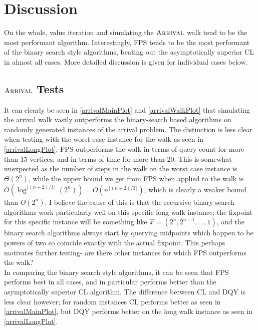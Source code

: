 \section{Discussion}
On the whole, value iteration and simulating the $\textsc{Arrival}$ walk tend to be
the most performant algorithm. Interestingly, FPS tends to be the most
performant of the binary search style algorithms, beating out the asymptotically
superior CL in almost all cases. More detailed discussion is given for individual cases below.
\subsection{$\textsc{Arrival}$ Tests}
It can clearly be seen in \cref{arrivalMainPlot} and \cref{arrivalWalkPlot}
that simulating the arrival walk vastly outperforms the binary-search based
algorithms on randomly generated instances of the arrival problem.
The distinction is less clear when testing with the worst case instance
for the walk as seen in \cref{arrivalLongPlot}; FPS outperforms the walk
in terms of query count for more than 15 vertices, and in terms of time for more than
20. This is somewhat unexpected as the number of steps in the walk on
the worst case instance is $\Theta(2^n)$, while the upper bound we
get from FPS when applied to the walk is 
$O(\log^{\lceil (n + 2)/3 \rceil } (2^n)) = O(n^{\lceil (n + 2)/3 \rceil})$,
which is clearly a weaker bound than $O(2^n)$. I believe the cause of this
is that the recursive binary search algorithms work particularly well
on this specific long walk instance; the fixpoint for this specific instance
will be something like $\vec{x} = (2^{n}, 2^{n - 1}, ..., 1)$, and the
binary search algorithms always start by querying midpoints which happen
to be powers of two so coincide exactly with the actual fixpoint.
This perhaps motivates further testing- are there other instances
for which FPS outperforms the walk?  \\
In comparing the binary search style algorithms, it can be seen that
FPS performs best in all cases, and in particular performs better
than the asymptotically superior CL algorithm. The difference between
CL and DQY is less clear however; for random instances CL performs
better as seen in \cref{arrivalMainPlot},
but DQY performs better on the long walk instance as seen in \cref{arrivalLongPlot}.


